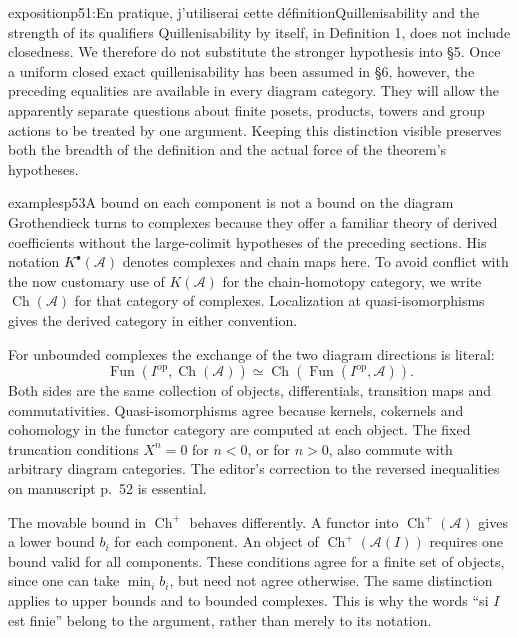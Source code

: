 \begin{dcomment}{exposition}{p51:En pratique, j'utiliserai cette définition}{Quillenisability and the strength of its qualifiers}
Quillenisability by itself, in Definition 1, does not include closedness. We therefore do not substitute the stronger hypothesis into \S5. Once a uniform closed exact quillenisability has been assumed in \S6, however, the preceding equalities are available in every diagram category. They will allow the apparently separate questions about finite posets, products, towers and group actions to be treated by one argument. Keeping this distinction visible preserves both the breadth of the definition and the actual force of the theorem's hypotheses.
\end{dcomment}

\begin{dcomment}{examples}{p53}{A bound on each component is not a bound on the diagram}
Grothendieck turns to complexes because they offer a familiar theory of derived coefficients without the large-colimit hypotheses of the preceding sections. His notation $K^\bullet(\mathcal A)$ denotes complexes and chain maps here. To avoid conflict with the now customary use of $K(\mathcal A)$ for the chain-homotopy category, we write $\operatorname{Ch}(\mathcal A)$ for that category of complexes. Localization at quasi-isomorphisms gives the derived category in either convention.

For unbounded complexes the exchange of the two diagram directions is literal:
\[
 \operatorname{Fun}(I^{\mathrm{op}},\operatorname{Ch}(\mathcal A))
 \simeq \operatorname{Ch}(\operatorname{Fun}(I^{\mathrm{op}},\mathcal A)).
\]
Both sides are the same collection of objects, differentials, transition maps and commutativities. Quasi-isomorphisms agree because kernels, cokernels and cohomology in the functor category are computed at each object. The fixed truncation conditions $X^n=0$ for $n<0$, or for $n>0$, also commute with arbitrary diagram categories. The editor's correction to the reversed inequalities on manuscript p.~52 is essential.

The movable bound in $\operatorname{Ch}^+$ behaves differently. A functor into $\operatorname{Ch}^+(\mathcal A)$ gives a lower bound $b_i$ for each component. An object of $\operatorname{Ch}^+(\mathcal A(I))$ requires one bound valid for all components. These conditions agree for a finite set of objects, since one can take $\min_i b_i$, but need not agree otherwise. The same distinction applies to upper bounds and to bounded complexes. This is why the words ``si $I$ est finie'' belong to the argument, rather than merely to its notation.


\end{dcomment}

